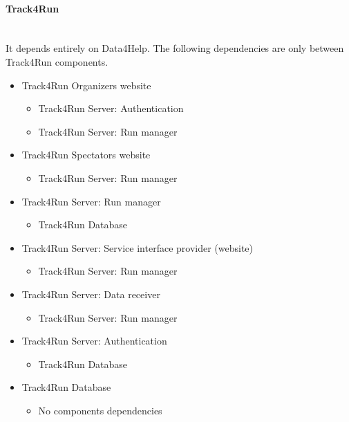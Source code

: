		\paragraph{Track4Run}\mbox{}\\
		It depends entirely on Data4Help. The following dependencies are only between Track4Run components.
		\begin{itemize}
			\item{Track4Run Organizers website}
			\begin{itemize}\item{Track4Run Server: Authentication}\item{Track4Run Server: Run manager}\end{itemize}
			\item{Track4Run Spectators website}
			\begin{itemize}\item{Track4Run Server: Run manager}\end{itemize}
			\item{Track4Run Server: Run manager}
			\begin{itemize}\item{Track4Run Database}\end{itemize}
			\item{Track4Run Server: Service interface provider (website)}
			\begin{itemize}\item{Track4Run Server: Run manager}\end{itemize}
			\item{Track4Run Server: Data receiver}
			\begin{itemize}\item{Track4Run Server: Run manager}\end{itemize}
			\item{Track4Run Server: Authentication}
			\begin{itemize}\item{Track4Run Database}\end{itemize}
			\item{Track4Run Database}
			\begin{itemize}\item{No components dependencies}\end{itemize}
		\end{itemize}
